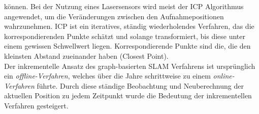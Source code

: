 können. Bei der Nutzung eines Lasersensors wird meist der \ac{ICP} Algorithmus angewendet, um die Veränderungen zwischen den Aufnahmepositionen 
wahrzunehmen. \acs{ICP} ist ein iteratives, ständig wiederholendes Verfahren, das die korrespondierenden Punkte schätzt und solange transformiert, bis diese unter 
einem gewissen Schwellwert liegen. Korrespondierende Punkte sind die, die den kleinsten Abstand zueinander haben (Closest Point). \cite{robotik2.2020m}
\\ 
Der inkrementelle Ansatz des graph-basierten \acs{SLAM} Verfahrens ist ursprünglich ein \textit{offline-Verfahren}, welches über die Jahre 
schrittweise zu einem \textit{online-Verfahren} führte. Durch diese ständige Beobachtung und Neuberechnung der aktuellen Position zu jedem 
Zeitpunkt wurde die Bedeutung der inkrementellen Verfahren gesteigert. %

